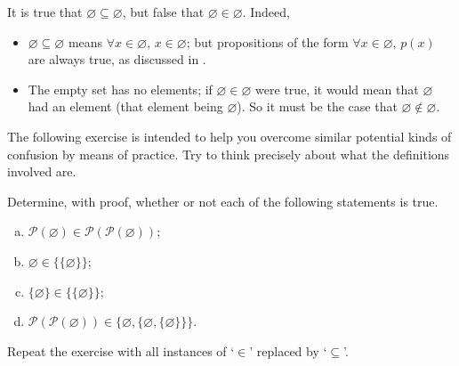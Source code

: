 \begin{example}
It is true that $\varnothing \subseteq \varnothing$, but false that $\varnothing \in \varnothing$. Indeed,
\begin{itemize}
\item $\varnothing \subseteq \varnothing$ means $\forall x \in \varnothing,\, x \in \varnothing$; but propositions of the form $\forall x \in \varnothing,\, p(x)$ are always true, as discussed in .
\item The empty set has no elements; if $\varnothing \in \varnothing$ were true, it would mean that $\varnothing$ had an element (that element being $\varnothing$). So it must be the case that $\varnothing \not \in \varnothing$.
\end{itemize}
\end{example}

The following exercise is intended to help you overcome similar potential kinds of confusion by means of practice. Try to think precisely about what the definitions involved are.

\begin{exercise}
Determine, with proof, whether or not each of the following statements is true.
\begin{enumerate}[(a)]
\item $\mathcal{P}(\varnothing) \in \mathcal{P}(\mathcal{P}(\varnothing))$;
\item $\varnothing \in \{ \{ \varnothing \} \}$;
\item $\{ \varnothing \} \in \{ \{ \varnothing \} \}$;
\item $\mathcal{P}(\mathcal{P}(\varnothing)) \in \{ \varnothing, \{ \varnothing, \{ \varnothing \} \} \}$.
\end{enumerate}
Repeat the exercise with all instances of `$\in$' replaced by `$\subseteq$'.
\end{exercise}